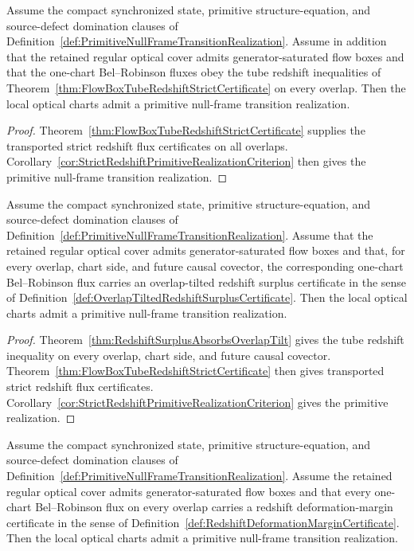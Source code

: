 \begin{corollary}\label{cor:TubeRedshiftPrimitiveRealizationCriterion}
Assume the compact synchronized state, primitive structure-equation, and source-defect domination clauses of Definition~\ref{def:PrimitiveNullFrameTransitionRealization}.  Assume in addition that the retained regular optical cover admits generator-saturated flow boxes and that the one-chart Bel--Robinson fluxes obey the tube redshift inequalities of Theorem~\ref{thm:FlowBoxTubeRedshiftStrictCertificate} on every overlap.  Then the local optical charts admit a primitive null-frame transition realization.
\end{corollary}

\begin{proof}
Theorem~\ref{thm:FlowBoxTubeRedshiftStrictCertificate} supplies the transported strict redshift flux certificates on all overlaps.  Corollary~\ref{cor:StrictRedshiftPrimitiveRealizationCriterion} then gives the primitive null-frame transition realization.
\end{proof}

\begin{corollary}\label{cor:SurplusRedshiftPrimitiveRealizationCriterion}
Assume the compact synchronized state, primitive structure-equation, and source-defect domination clauses of Definition~\ref{def:PrimitiveNullFrameTransitionRealization}.  Assume that the retained regular optical cover admits generator-saturated flow boxes and that, for every overlap, chart side, and future causal covector, the corresponding one-chart Bel--Robinson flux carries an overlap-tilted redshift surplus certificate in the sense of Definition~\ref{def:OverlapTiltedRedshiftSurplusCertificate}.  Then the local optical charts admit a primitive null-frame transition realization.
\end{corollary}

\begin{proof}
Theorem~\ref{thm:RedshiftSurplusAbsorbsOverlapTilt} gives the tube redshift inequality on every overlap, chart side, and future causal covector.  Theorem~\ref{thm:FlowBoxTubeRedshiftStrictCertificate} then gives transported strict redshift flux certificates.  Corollary~\ref{cor:StrictRedshiftPrimitiveRealizationCriterion} gives the primitive realization.
\end{proof}

\begin{corollary}\label{cor:DeformationMarginPrimitiveRealizationCriterion}
Assume the compact synchronized state, primitive structure-equation, and source-defect domination clauses of Definition~\ref{def:PrimitiveNullFrameTransitionRealization}.  Assume the retained regular optical cover admits generator-saturated flow boxes and that every one-chart Bel--Robinson flux on every overlap carries a redshift deformation-margin certificate in the sense of Definition~\ref{def:RedshiftDeformationMarginCertificate}.  Then the local optical charts admit a primitive null-frame transition realization.
\end{corollary}

